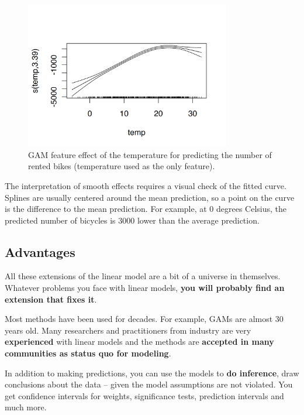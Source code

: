 \documentclass[
  11pt,
]{scrbook}
\begin{document}
\begin{figure}

{\centering \includegraphics[width=0.8\textwidth]{images/splines-curve-1} 

}

\caption{GAM feature effect of the temperature for predicting the number of rented bikes (temperature used as the only feature).}\label{fig:splines-curve}
\end{figure}

The interpretation of smooth effects requires a visual check of the fitted curve.
Splines are usually centered around the mean prediction, so a point on the curve is the difference to the mean prediction.
For example, at 0 degrees Celsius, the predicted number of bicycles is 3000 lower than the average prediction.

\hypertarget{advantages-1}{%
\subsection{Advantages}\label{advantages-1}}

All these extensions of the linear model are a bit of a universe in themselves.
Whatever problems you face with linear models, \textbf{you will probably find an extension that fixes it}.

Most methods have been used for decades.
For example, GAMs are almost 30 years old.
Many researchers and practitioners from industry are very \textbf{experienced} with linear models and the methods are \textbf{accepted in many communities as status quo for modeling}.

In addition to making predictions, you can use the models to \textbf{do inference}, draw conclusions about the data -- given the model assumptions are not violated.
You get confidence intervals for weights, significance tests, prediction intervals and much more.
\end{document}
